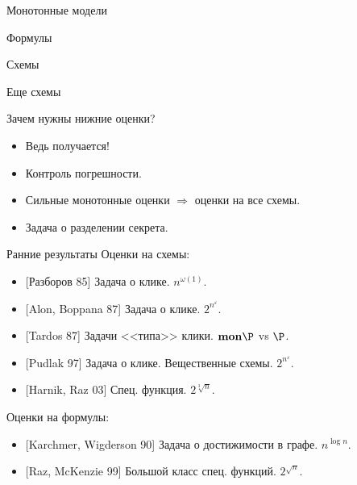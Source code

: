 \begin{frame}{Монотонные модели}

    \begin{minipage}{0.33\linewidth}
        \centering
        Формулы
        \vspace{0.2cm}
        
        
    \end{minipage}
    \begin{minipage}{0.33\linewidth}
        \centering
        Схемы
        \vspace{0.2cm}
        
        
    \end{minipage}
    \begin{minipage}{0.32\linewidth}
        \centering
        Еще схемы
        \vspace{0.2cm}
        
        
    \end{minipage}

    \pause
    Зачем нужны нижние оценки?
    \begin{itemize}
        \item Ведь получается!
            \pause
        \item Контроль погрешности.
            \pause
        \item Сильные монотонные оценки $\Rightarrow$ оценки на все схемы.
            \pause
        \item Задача о разделении секрета.
    \end{itemize}
\end{frame}


\begin{frame}{Ранние результаты}
    \pause
    Оценки на схемы:
    \begin{itemize}
        \item{} [Разборов 85] Задача о клике. $n^{\omega(1)}$.
        \item{} [Alon, Boppana 87] Задача о клике. $2^{n^{\varepsilon}}$.
        \item{} [Tardos 87] Задачи <<типа>> клики. $\mathbf{mon}\P$ vs $\P$.
        \item{} [Pudlak 97] Задача о клике. Вещественные схемы. $2^{n^{\varepsilon}}$.
        \item{} [Harnik, Raz 03] Спец. функция. $2^{\sqrt[3]{n}}$.
    \end{itemize}

    \vspace{0.5cm}
    \pause
    Оценки на формулы:
    \begin{itemize}
        \item{} [Karchmer, Wigderson 90] Задача о достижимости в графе. $n^{\log n}$.
        \item{} [Raz, McKenzie 99] Большой класс спец. функций. $2^{\sqrt{n}}$.
    \end{itemize}
\end{frame}



